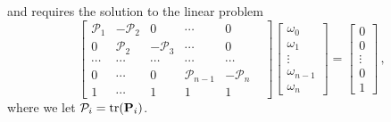 \documentclass[letterpaper, 10 pt, conference]{ieeeconf}  %
\providecommand{\DIFaddbegin}{} %
\providecommand{\DIFaddend}{} %
\providecommand{\DIFdelbegin}{} %
\providecommand{\DIFdelend}{} %
\begin{document}
and requires the solution to the linear problem
\begin{equation}
   \DIFdelbegin %
\DIFdelend \DIFaddbegin \begin{bmatrix}
      \mathcal{P}_1 & -\mathcal{P}_2 & 0 & \cdots & 0 \\
      0 & \mathcal{P}_2 & -\mathcal{P}_3 & \cdots & 0 \\
      \cdots & \cdots & \cdots & \cdots & \cdots & \\
      0 & \cdots & 0 & \mathcal{P}_{n-1} & -\mathcal{P}_{n} \\
      1 & \cdots & 1 & 1 & 1 &
   \end{bmatrix}\DIFaddend 
   \DIFdelbegin %
\DIFdelend \DIFaddbegin \begin{bmatrix}
      \omega_0 \\
      \omega_1 \\
      \vdots \\
      \omega_{n-1} \\
      \omega_{n}
   \end{bmatrix}\DIFaddend 
   =
   \begin{bmatrix}
      0 \\
      0 \\
      \vdots \\
      0 \\
      1
   \end{bmatrix}\,, \label{eqn:fci_eq_sys}
\end{equation}
where we let $\mathcal{P}_i = \operatorname{tr}({{\mathbf{P}}}_i)$.
\end{document}
